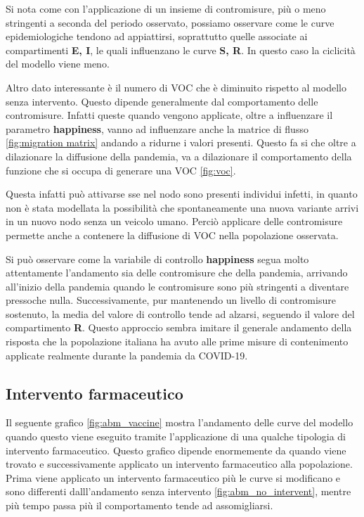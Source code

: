 Si nota come con l'applicazione di un insieme di contromisure, più o meno stringenti a seconda del periodo osservato, 
possiamo osservare come le curve epidemiologiche tendono ad appiattirsi, soprattutto quelle associate ai compartimenti 
\textbf{E, I}, le quali influenzano le curve \textbf{S, R}. In questo caso la ciclicità del modello viene meno. 

Altro dato interessante è il numero di VOC che è diminuito rispetto al modello senza intervento.
Questo dipende generalmente dal comportamento delle contromisure. Infatti queste quando vengono applicate, 
oltre a influenzare il parametro \textbf{happiness}, vanno ad influenzare anche la matrice di flusso \ref{fig:migration matrix}
andando a ridurne i valori presenti. Questo fa si che oltre a dilazionare la diffusione della pandemia, 
va a dilazionare il comportamento della funzione che si occupa di generare una VOC \ref{fig:voc}. 

Questa infatti può attivarse sse nel nodo sono presenti individui infetti, in quanto non è stata modellata la 
possibilità che spontaneamente una nuova variante arrivi in un nuovo nodo senza un veicolo umano. Perciò 
applicare delle contromisure permette anche a contenere la diffusione di VOC nella popolazione osservata.

Si può osservare come la variabile di controllo \textbf{happiness} segua molto attentamente l'andamento sia delle 
contromisure che della pandemia, arrivando all'inizio della pandemia quando le contromisure sono più stringenti 
a diventare pressoche nulla. Successivamente, pur mantenendo un livello di contromisure sostenuto, la media
del valore di controllo tende ad alzarsi, seguendo il valore del compartimento \textbf{R}. Questo approccio sembra 
imitare il generale andamento della risposta che la popolazione italiana ha avuto alle prime misure di contenimento 
applicate realmente durante la pandemia da COVID-19.
\newpage

\subsection{Intervento farmaceutico}
Il seguente grafico \ref{fig:abm_vaccine} mostra l'andamento delle curve del modello
quando questo viene eseguito tramite l'applicazione di una qualche tipologia di intervento farmaceutico.
Questo grafico dipende enormemente da quando viene trovato e successivamente applicato un intervento 
farmaceutico alla popolazione. Prima viene applicato un intervento farmaceutico più le curve si modificano 
e sono differenti dalll'andamento senza intervento \ref{fig:abm_no_intervent}, mentre più tempo passa più
il comportamento tende ad assomigliarsi.

